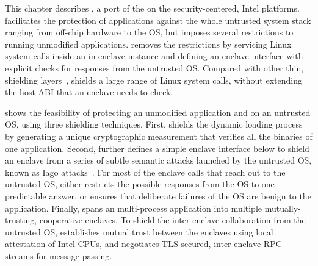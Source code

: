 
This chapter describes \graphenesgx{},
a port of the \graphene{} \libos{} on the security-centered, Intel \sgx{} platforms.
\sgx{} facilitates the protection of applications
against the whole untrusted system stack ranging from off-chip hardware to the OS,
but imposes several restrictions to running unmodified applications.
\graphenesgx{} removes the restrictions
by servicing Linux system calls inside an in-enclave \libos{} instance and defining an enclave interface with explicit checks for responses from the untrusted OS.
Compared with other thin, shielding layers~\cite{osdi16scone,shinde17panoply}, \graphenesgx{} shields a large range of Linux system calls,
without extending the host ABI that an enclave needs to check.



\graphenesgx{} shows the feasibility
of protecting an unmodified application and \libos{} on an untrusted OS, using three shielding techniques.
First, \graphenesgx{}
shields the dynamic loading process
by generating a unique cryptographic measurement that verifies all the binaries of one application.
Second, \graphenesgx{} further defines a simple
enclave interface
below \thehostabi{} to shield an enclave from a series of subtle semantic attacks
launched by the untrusted OS, known as Iago attacks~\cite{checkoway13iago}.
For most of the enclave calls that reach out to the untrusted OS,
\graphenesgx{} either restricts the possible responses
from the OS to one predictable answer,
or ensures that deliberate failures of the OS are benign to the application.
Finally, \graphenesgx{} spans an multi-process application
into multiple mutually-trusting, cooperative enclaves.
To shield the inter-enclave collaboration from the untrusted OS,
\graphenesgx{} establishes mutual trust between the enclaves
using local attestation of Intel CPUs,
and negotiates TLS-secured, inter-enclave RPC streams for message passing.


